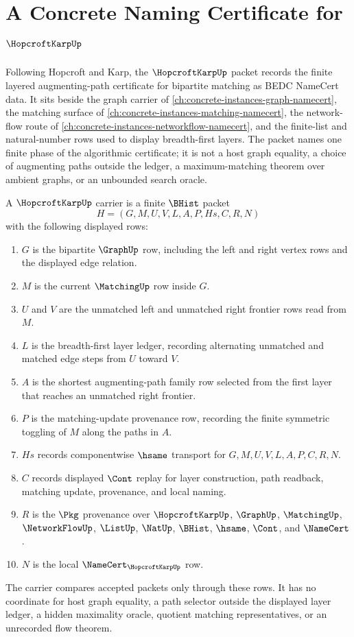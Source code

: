 \chapter{A Concrete Naming Certificate for $\HopcroftKarpUp$}
\label{ch:concrete-instances-hopcroft-karp-namecert}

Following Hopcroft and Karp, the $\HopcroftKarpUp$ packet records the finite layered augmenting-path certificate for bipartite matching as BEDC NameCert data. It sits beside the graph carrier of \autoref{ch:concrete-instances-graph-namecert}, the matching surface of \autoref{ch:concrete-instances-matching-namecert}, the network-flow route of \autoref{ch:concrete-instances-networkflow-namecert}, and the finite-list and natural-number rows used to display breadth-first layers. The packet names one finite phase of the algorithmic certificate; it is not a host graph equality, a choice of augmenting paths outside the ledger, a maximum-matching theorem over ambient graphs, or an unbounded search oracle.

\begin{definition}
\label{def:hopcroft-karp-carrier}
A $\HopcroftKarpUp$ carrier is a finite $\BHist$ packet
$$
H=(G,M,U,V,L,A,P,Hs,C,R,N)
$$
with the following displayed rows:
\begin{enumerate}
\item $G$ is the bipartite $\GraphUp$ row, including the left and right vertex rows and the displayed edge relation.
\item $M$ is the current $\MatchingUp$ row inside $G$.
\item $U$ and $V$ are the unmatched left and unmatched right frontier rows read from $M$.
\item $L$ is the breadth-first layer ledger, recording alternating unmatched and matched edge steps from $U$ toward $V$.
\item $A$ is the shortest augmenting-path family row selected from the first layer that reaches an unmatched right frontier.
\item $P$ is the matching-update provenance row, recording the finite symmetric toggling of $M$ along the paths in $A$.
\item $Hs$ records componentwise $\hsame$ transport for $G,M,U,V,L,A,P,C,R,N$.
\item $C$ records displayed $\Cont$ replay for layer construction, path readback, matching update, provenance, and local naming.
\item $R$ is the $\Pkg$ provenance over $\HopcroftKarpUp$, $\GraphUp$, $\MatchingUp$, $\NetworkFlowUp$, $\ListUp$, $\NatUp$, $\BHist$, $\hsame$, $\Cont$, and $\NameCert$.
\item $N$ is the local $\NameCert_{\HopcroftKarpUp}$ row.
\end{enumerate}
The carrier compares accepted packets only through these rows. It has no coordinate for host graph equality, a path selector outside the displayed layer ledger, a hidden maximality oracle, quotient matching representatives, or an unrecorded flow theorem.
\end{definition}

